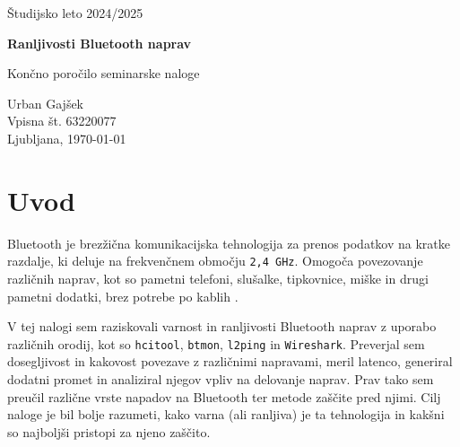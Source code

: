 \documentclass[11pt,a4paper,slovene]{article}
\begin{document}
\label{naslov}
\thispagestyle{empty}

\begin{center}
\begin{Large}
Študijsko leto 2024/2025\\
\end{Large}

\vspace*{4cm}
\begin{LARGE}
\textbf{Ranljivosti Bluetooth naprav\\}
\end{LARGE}
\vspace*{0.5cm}

\begin{Large}
Končno poročilo seminarske naloge\\

\vspace*{4cm}

Urban Gajšek\\
Vpisna št. 63220077\\

\vspace*{5cm}
Ljubljana, \today
\end{Large}
\end{center}

\pagebreak
\setcounter{page}{1}


\label{Kazalo}
\tableofcontents
\thispagestyle{empty}
\pagebreak

\section{Uvod}

Bluetooth je brezžična komunikacijska tehnologija za prenos podatkov na kratke razdalje, ki deluje na frekvenčnem območju \texttt{2,4 GHz}. Omogoča povezovanje različnih naprav, kot so pametni telefoni, slušalke, tipkovnice, miške in drugi pametni dodatki, brez potrebe po kablih \cite{networking_A_Z}.

V tej nalogi sem raziskovali varnost in ranljivosti Bluetooth naprav z uporabo različnih orodij, kot so \texttt{hcitool}, \texttt{btmon}, \texttt{l2ping} in \texttt{Wireshark}. Preverjal sem dosegljivost in kakovost povezave z različnimi napravami, meril latenco, generiral dodatni promet in analiziral njegov vpliv na delovanje naprav. Prav tako sem preučil različne vrste napadov na Bluetooth ter metode zaščite pred njimi. Cilj naloge je bil bolje razumeti, kako varna (ali ranljiva) je ta tehnologija in kakšni so najboljši pristopi za njeno zaščito.
\end{document}
